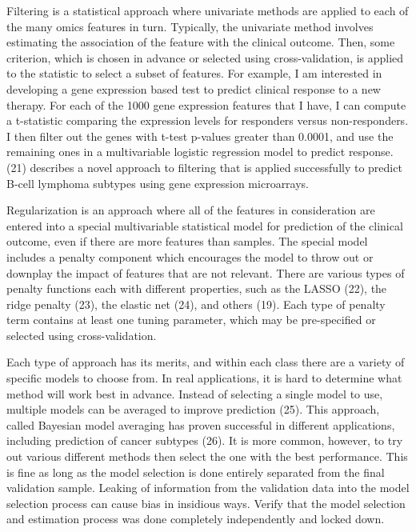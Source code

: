 \documentclass[11pt]{article}
\begin{document}
Filtering is a statistical approach where univariate methods are applied
to each of the many omics features in turn. Typically, the univariate
method involves estimating the association of the feature with the
clinical outcome. Then, some criterion, which is chosen in advance or
selected using cross-validation, is applied to the statistic to select a
subset of features. For example, I am interested in developing a gene
expression based test to predict clinical response to a new therapy. For
each of the 1000 gene expression features that I have, I can compute a
t-statistic comparing the expression levels for responders versus
non-responders. I then filter out the genes with t-test p-values greater
than 0.0001, and use the remaining ones in a multivariable logistic
regression model to predict response. (21) describes a novel approach to
filtering that is applied successfully to predict B-cell lymphoma
subtypes using gene expression microarrays.

Regularization is an approach where all of the features in consideration
are entered into a special multivariable statistical model for
prediction of the clinical outcome, even if there are more features than
samples. The special model includes a penalty component which encourages
the model to throw out or downplay the impact of features that are not
relevant. There are various types of penalty functions each with
different properties, such as the LASSO (22), the ridge penalty (23),
the elastic net (24), and others (19). Each type of penalty term
contains at least one tuning parameter, which may be pre-specified or
selected using cross-validation.

Each type of approach has its merits, and within each class there are a
variety of specific models to choose from. In real applications, it is
hard to determine what method will work best in advance. Instead of
selecting a single model to use, multiple models can be averaged to
improve prediction (25). This approach, called Bayesian model averaging
has proven successful in different applications, including prediction of
cancer subtypes (26). It is more common, however, to try out various
different methods then select the one with the best performance. This is
fine as long as the model selection is done entirely separated from the
final validation sample. Leaking of information from the validation data
into the model selection process can cause bias in insidious ways.
Verify that the model selection and estimation process was done
completely independently and locked down.
\end{document}
